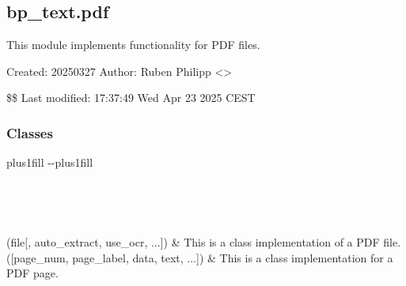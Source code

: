 \documentclass[letterpaper,10pt,english]{sphinxmanual}
\begin{document}
\sphinxstepscope


\subsection{bp\_text.pdf}
\label{\detokenize{generated/bp_text.pdf:module-bp_text.pdf}}\label{\detokenize{generated/bp_text.pdf:bp-text-pdf}}\label{\detokenize{generated/bp_text.pdf::doc}}
\sphinxAtStartPar
This module implements functionality for PDF files.

\sphinxAtStartPar
Created: 2025\sphinxhyphen{}03\sphinxhyphen{}27
Author: Ruben Philipp \textless{}\textgreater{}

\sphinxAtStartPar
\$\$ Last modified:  17:37:49 Wed Apr 23 2025 CEST
\subsubsection*{Classes}


\begin{savenotes}
\sphinxatlongtablestart
\sphinxthistablewithglobalstyle
\sphinxthistablewithnovlinesstyle
\makeatletter
  \LTleft \@totalleftmargin plus1fill
  \LTright\dimexpr\columnwidth-\@totalleftmargin-\linewidth\relax plus1fill
\makeatother
\begin{longtable}{}
\sphinxtoprule
\endfirsthead

\\
\sphinxtoprule
\endhead

\sphinxbottomrule
{}\\
\endfoot

\endlastfoot
\sphinxtableatstartofbodyhook

\sphinxAtStartPar
{\hyperref[\detokenize{generated/bp_text.pdf:bp_text.pdf.PdfFile}]{}}(file{[}, auto\_extract, use\_ocr, ...{]})
&
\sphinxAtStartPar
This is a class implementation of a PDF file.
\\
\sphinxhline
\sphinxAtStartPar
{\hyperref[\detokenize{generated/bp_text.pdf:bp_text.pdf.PdfPage}]{}}({[}page\_num, page\_label, data, text, ...{]})
&
\sphinxAtStartPar
This is a class implementation for a PDF page.
\\
\sphinxbottomrule
\end{longtable}
\sphinxtableafterendhook
\sphinxatlongtableend
\end{savenotes}
\end{document}
